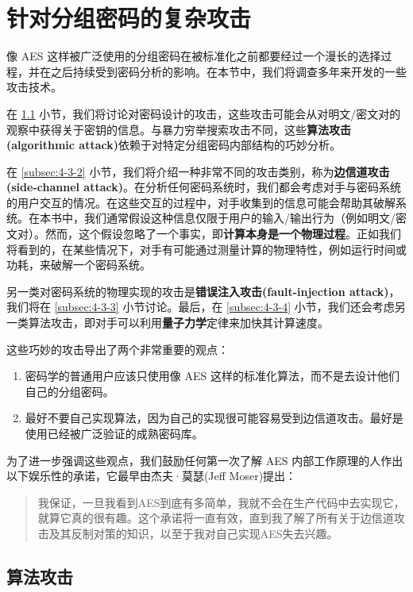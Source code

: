 \section{针对分组密码的复杂攻击}

像 AES 这样被广泛使用的分组密码在被标准化之前都要经过一个漫长的选择过程，并在之后持续受到密码分析的影响。在本节中，我们将调查多年来开发的一些攻击技术。

在 \ref{subsec:4-3-1} 小节，我们将讨论对密码设计的攻击，这些攻击可能会从对明文/密文对的观察中获得关于密钥的信息。与暴力穷举搜索攻击不同，这些\textbf{算法攻击(algorithmic attack)}依赖于对特定分组密码内部结构的巧妙分析。

在 \ref{subsec:4-3-2} 小节，我们将介绍一种非常不同的攻击类别，称为\textbf{边信道攻击(side-channel attack)}。在分析任何密码系统时，我们都会考虑对手与密码系统的用户交互的情况。在这些交互的过程中，对手收集到的信息可能会帮助其破解系统。在本书中，我们通常假设这种信息仅限于用户的输入/输出行为（例如明文/密文对）。然而，这个假设忽略了一个事实，即\textbf{计算本身是一个物理过程}。正如我们将看到的，在某些情况下，对手有可能通过测量计算的物理特性，例如运行时间或功耗，来破解一个密码系统。

另一类对密码系统的物理实现的攻击是\textbf{错误注入攻击(fault-injection attack)}，我们将在 \ref{subsec:4-3-3} 小节讨论。最后，在 \ref{subsec:4-3-4} 小节，我们还会考虑另一类算法攻击，即对手可以利用\textbf{量子力学}定律来加快其计算速度。

这些巧妙的攻击导出了两个非常重要的观点：
\begin{enumerate}
	\item 密码学的普通用户应该只使用像 AES 这样的标准化算法，而不是去设计他们自己的分组密码。
	\item 最好不要自己实现算法，因为自己的实现很可能容易受到边信道攻击。最好是使用已经被广泛验证的成熟密码库。
\end{enumerate}
为了进一步强调这些观点，我们鼓励任何第一次了解 AES 内部工作原理的人作出以下娱乐性的承诺，它最早由杰夫·莫瑟(Jeff Moser)提出：
\begin{quote}
我保证，一旦我看到AES到底有多简单，我就不会在生产代码中去实现它，就算它真的很有趣。这个承诺将一直有效，直到我了解了所有关于边信道攻击及其反制对策的知识，以至于我对自己实现AES失去兴趣。
\end{quote}

\subsection{算法攻击}\label{subsec:4-3-1}

